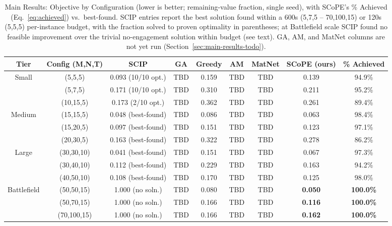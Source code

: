 \documentclass[smallcondensed]{svjour3}
\begin{document}
\begin{table}[htbp]
\centering
\small
\caption{Main Results: Objective by Configuration (lower is better; remaining-value fraction, single seed), with SCoPE's \% Achieved (Eq.~\eqref{eq:achieved}) vs.\ best-found. SCIP entries report the best solution found within a 600s (5,7,5 -- 70,100,15) or 120s (5,5,5) per-instance budget, with the fraction solved to proven optimality in parentheses; at Battlefield scale SCIP found no feasible improvement over the trivial no-engagement solution within budget (see text). GA, AM, and MatNet columns are not yet run (Section~\ref{sec:main-results-todo}).}
\label{tab:main_results}
\begin{tabular}{c|c|ccccc|c|c}
\hline
\textbf{Tier} & \textbf{Config (M,N,T)} & \textbf{SCIP} & \textbf{GA} & \textbf{Greedy} & \textbf{AM} & \textbf{MatNet} & \textbf{SCoPE (ours)} & \textbf{\% Achieved} \\ \hline
\multirow{3}{*}{Small}      & (5,5,5)     & 0.093 (10/10 opt.) & TBD & 0.159 & TBD & TBD & 0.139 & 94.9\% \\
                             & (5,7,5)     & 0.171 (10/10 opt.) & TBD & 0.310 & TBD & TBD & 0.211 & 95.2\% \\
                             & (10,15,5)   & 0.173 (2/10 opt.)  & TBD & 0.362 & TBD & TBD & 0.261 & 89.4\% \\ \hline
\multirow{3}{*}{Medium}     & (15,15,5)   & 0.048 (best-found) & TBD & 0.086 & TBD & TBD & 0.063 & 98.4\% \\
                             & (15,20,5)   & 0.097 (best-found) & TBD & 0.151 & TBD & TBD & 0.123 & 97.1\% \\
                             & (20,30,5)   & 0.163 (best-found) & TBD & 0.322 & TBD & TBD & 0.278 & 86.2\% \\ \hline
\multirow{3}{*}{Large}      & (30,30,10)  & 0.041 (best-found) & TBD & 0.151 & TBD & TBD & 0.067 & 97.3\% \\
                             & (30,40,10)  & 0.112 (best-found) & TBD & 0.229 & TBD & TBD & 0.163 & 94.2\% \\
                             & (40,50,10)  & 0.108 (best-found) & TBD & 0.170 & TBD & TBD & 0.125 & 98.0\% \\ \hline
\multirow{3}{*}{Battlefield} & (50,50,15)  & 1.000 (no soln.)   & TBD & 0.080 & TBD & TBD & \textbf{0.050} & \textbf{100.0\%} \\
                             & (50,70,15)  & 1.000 (no soln.)   & TBD & 0.166 & TBD & TBD & \textbf{0.116} & \textbf{100.0\%} \\
                             & (70,100,15) & 1.000 (no soln.)   & TBD & 0.166 & TBD & TBD & \textbf{0.162} & \textbf{100.0\%} \\ \hline
\end{tabular}
\end{table}
\end{document}
